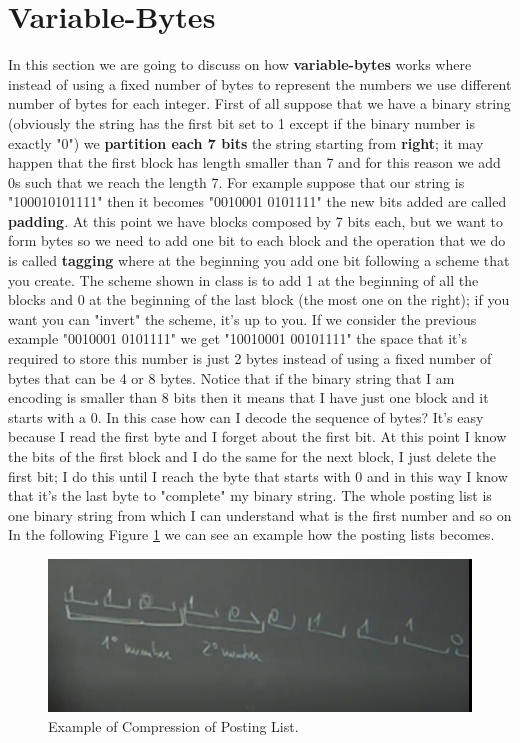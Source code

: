 \section{Variable-Bytes}
In this section we are going to discuss on how \textbf{variable-bytes} works where instead of using a fixed number of bytes to represent the numbers we use different number of bytes for each integer.\newline
First of all suppose that we have a binary string (obviously the string has the first bit set to 1 except if the binary number is exactly "0") we \textbf{partition each 7 bits} the string starting from \textbf{right}; it may happen that the first block has length smaller than 7 and for this reason we add 0s such that we reach the length 7.\newline
For example suppose that our string is "100010101111" then it becomes "0010001 0101111" the new bits added are called \textbf{padding}. At this point we have blocks composed by 7 bits each, but we want to form bytes so we need to add one bit to each block and the operation that we do is called \textbf{tagging} where at the beginning you add one bit following a scheme that you create. The scheme shown in class is to add 1 at the beginning of all the blocks and 0 at the beginning of the last block (the most one on the right); if you want you can "invert" the scheme, it's up to you.\newline
If we consider the previous example "0010001 0101111" we get "10010001 00101111" the space that it's required to store this number is just 2 bytes instead of using a fixed number of bytes that can be 4 or 8 bytes. Notice that if the binary string that I am encoding is smaller than 8 bits then it means that I have just one block and it starts with a 0.\newline
In this case how can I decode the sequence of bytes? It's easy because I read the first byte and I forget about the first bit. At this point I know the bits of the first block and I do the same for the next block, I just delete the first bit; I do this until I reach the byte that starts with 0 and in this way I know that it's the last byte to "complete" my binary string.\newline
The whole posting list is one binary string from which I can understand what is the first number and so on\newline
In the following Figure \ref{fig:compressionposting} we can see an example how the posting lists becomes.\newline
\begin{figure}
    \centering
    \includegraphics[width=0.75\linewidth]{images/compressionposting.PNG}
    \caption{Example of Compression of Posting List.}
    \label{fig:compressionposting}
\end{figure}
